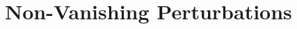 \documentclass[student, noshadow, lsr, english, aspectratio=169, t]{ITR_LSR_slides}
\begin{document}
	

\section{Non-Vanishing Perturbations}
\end{document}
